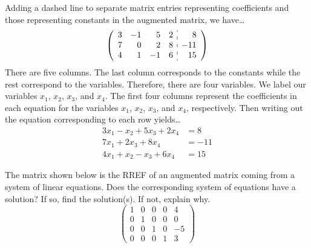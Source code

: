 \documentclass[12pt,letterpaper]{exam}
\begin{document}
\begin{questions}
\sol Adding a dashed line to separate matrix entries representing coefficients and those representing constants in the augmented matrix, we have\dots
	\[
	\left(
	\begin{array}{rrrr:r}
	3 & -1 & 5 & 2 & 8 \\ 
	7 & 0 & 2 & 8 & -11 \\ 
	4 & 1 & -1 & 6 & 15
	\end{array} 
	\right)
	\]
There are five columns. The last column corresponds to the constants while the rest correspond to the variables. Therefore, there are four variables. We label our variables $x_1$, $x_2$, $x_3$, and $x_4$. The first four columns represent the coefficients in each equation for the variables $x_1$, $x_2$, $x_3$, and $x_4$, respectively. Then writing out the equation corresponding to each row yields\dots
	\[
	\begin{aligned}
	3x_1 - x_2 + 5x_3 + 2x_4&= 8 \\
	7x_1 + 2x_3 + 8x_4&= -11 \\
	4x_1 + x_2 - x_3 + 6x_4&= 15
	\end{aligned}
	\]



\newpage
\question[10] The matrix shown below is the RREF of an augmented matrix coming from a system of linear equations. Does the corresponding system of equations have a solution? If so, find the solution(s). If not, explain why. 
	\[
	\begin{pmatrix}
	1 & 0 & 0 & 0 & 4 \\
	0 & 1 & 0 & 0 & 0 \\
	0 & 0 & 1 & 0 & -5 \\
	0 & 0 & 0 & 1 & 3
	\end{pmatrix}
	\] \pspace


\end{questions}
\end{document}
